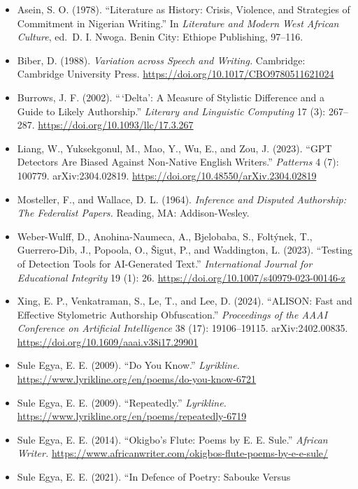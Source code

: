 \begin{itemize}
\tightlist
\item
  Asein, S. O. (1978). ``Literature as History: Crisis, Violence, and
  Strategies of Commitment in Nigerian Writing.'' In \emph{Literature
  and Modern West African Culture}, ed.~D. I. Nwoga. Benin City: Ethiope
  Publishing, 97--116.
\item
  Biber, D. (1988). \emph{Variation across Speech and Writing.}
  Cambridge: Cambridge University Press.
  \url{https://doi.org/10.1017/CBO9780511621024}
\item
  Burrows, J. F. (2002). ``\,`Delta': A Measure of Stylistic Difference
  and a Guide to Likely Authorship.'' \emph{Literary and Linguistic
  Computing} 17 (3): 267--287.
  \url{https://doi.org/10.1093/llc/17.3.267}
\item
  Liang, W., Yuksekgonul, M., Mao, Y., Wu, E., and Zou, J. (2023). ``GPT
  Detectors Are Biased Against Non-Native English Writers.''
  \emph{Patterns} 4 (7): 100779. arXiv:2304.02819.
  \url{https://doi.org/10.48550/arXiv.2304.02819}
\item
  Mosteller, F., and Wallace, D. L. (1964). \emph{Inference and Disputed
  Authorship: The Federalist Papers.} Reading, MA: Addison-Wesley.
\item
  Weber-Wulff, D., Anohina-Naumeca, A., Bjelobaba, S., Foltýnek, T.,
  Guerrero-Dib, J., Popoola, O., Šigut, P., and Waddington, L. (2023).
  ``Testing of Detection Tools for AI-Generated Text.''
  \emph{International Journal for Educational Integrity} 19 (1): 26.
  \url{https://doi.org/10.1007/s40979-023-00146-z}
\item
  Xing, E. P., Venkatraman, S., Le, T., and Lee, D. (2024). ``ALISON:
  Fast and Effective Stylometric Authorship Obfuscation.''
  \emph{Proceedings of the AAAI Conference on Artificial Intelligence}
  38 (17): 19106--19115. arXiv:2402.00835.
  \url{https://doi.org/10.1609/aaai.v38i17.29901}
\item
  Sule Egya, E. E. (2009). ``Do You Know.'' \emph{Lyrikline.}
  \url{https://www.lyrikline.org/en/poems/do-you-know-6721}
\item
  Sule Egya, E. E. (2009). ``Repeatedly.'' \emph{Lyrikline.}
  \url{https://www.lyrikline.org/en/poems/repeatedly-6719}
\item
  Sule Egya, E. E. (2014). ``Okigbo's Flute: Poems by E. E. Sule.''
  \emph{African Writer.}
  \url{https://www.africanwriter.com/okigbos-flute-poems-by-e-e-sule/}
\item
  Sule Egya, E. E. (2021). ``In Defence of Poetry: Sabouke Versus

\end{itemize}
